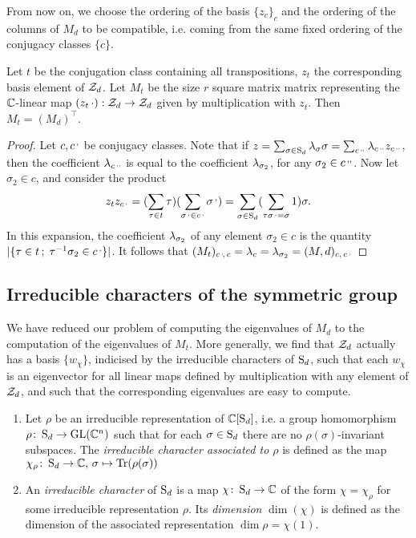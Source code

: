 From now on, we choose the ordering of the basis $\{z_c\}_c$ and the ordering of the columns of $M_d$ to be compatible, i.e. coming from the same fixed ordering of the conjugacy classes $\{c\}$.

\begin{prop} \label{prop:transpose-correspondence}
 Let $t$ be the conjugation class containing all transpositions, $z_t$ the corresponding basis element of $\mathcal{Z}_d$. Let $M_t$ be the size $r$ square matrix matrix representing the $\mathbb{C}$-linear map $(z_t\,\cdot):\mathcal{Z}_d\to\mathcal{Z}_d$ given by multiplication with $z_t$. Then $M_t=(M_d)^{\top}$.
\end{prop}
\begin{proof}
 Let $c,c^\textrm{\,,}$ be conjugacy classes. Note that if $z=\sum_{\sigma\in\operatorname{S}_d}\lambda_\sigma \sigma=\sum_{c^{\textrm{\,,}\textrm{,}}}\lambda_{c^{\textrm{\,,}\textrm{,}}} z_{c^{\textrm{\,,}\textrm{,}}}$, then the coefficient $\lambda_{c^{\textrm{\,,}\textrm{,}}}$ is equal to the coefficient $\lambda_{\sigma_2}$, for any $\sigma_2\in c^{\textrm{\,,}\textrm{,}}$. Now let $\sigma_2\in c$, and consider the product
 \[
  z_tz_{c^\textrm{\,,}}=(\sum_{\tau\in t}\tau)(\sum_{\sigma^\textrm{\,,}\in c^\textrm{\,,}}\sigma^\textrm{\,,})=\sum_{\sigma\in\operatorname{S}_d}(\sum_{\tau \sigma^\textrm{\,,}=\sigma}1)\sigma.
 \]
 In this expansion, the coefficient $\lambda_{\sigma_2}$ of any element $\sigma_2\in c$ is the quantity $|\{\tau\in t\,;\; \tau^{-1}\sigma_2\in c^\textrm{\,,}\}|$. It follows that $(M_t)_{c^\textrm{\,,}\!,\, c}=\lambda_c=\lambda_{\sigma_2}=(M,d)_{c,\, c^\textrm{\,,}}$
\end{proof}

\subsection{Irreducible characters of the symmetric group}

We have reduced our problem of computing the eigenvalues of $M_d$ to the computation of the eigenvalues of $M_t$. More generally, we find that $\mathcal{Z}_d$ actually has a basis $\{w_\chi\}$, indicised by the irreducible characters of $\operatorname{S}_d$, such that each $w_\chi$ is an eigenvector for all linear maps defined by multiplication with any element of $\mathcal{Z}_d$, and such that the corresponding eigenvalues are easy to compute.

\begin{defi}
 \begin{enumerate}
  \item Let $\rho$ be an irreducible representation of $\mathbb{C}[\operatorname{S}_d]$, i.e. a group homomorphism $\rho\colon \operatorname{S}_d\to \operatorname{GL}(\mathbb{C}^n)$ such that for each $\sigma\in\operatorname{S}_d$ there are no $\rho(\sigma)$-invariant subspaces. The \emph{irreducible character associated to $\rho$} is defined as the map $\chi_\rho\colon \operatorname{S}_d\to\mathbb{C},\, \sigma\mapsto\operatorname{Tr}(\rho(\sigma))$
  \item An \emph{irreducible character} of $\operatorname{S}_d$ is a map $\chi\colon \operatorname{S}_d\to\mathbb{C}$ of the form $\chi=\chi_\rho$ for some irreducible representation $\rho$. Its \emph{dimension} $\dim(\chi)$ is defined as the dimension of the associated representation $\dim\rho=\chi(1)$.
 \end{enumerate}
\end{defi}

